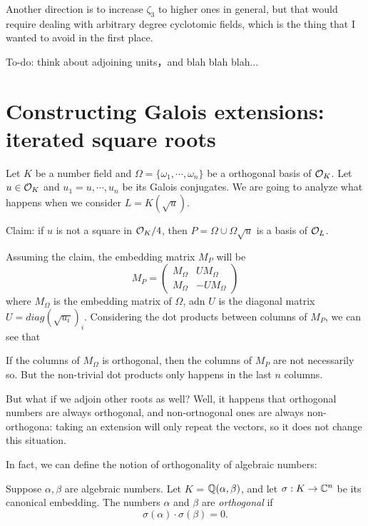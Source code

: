 \documentclass{amsart}
\begin{document}
Another direction is to increase $\zeta_3$ to higher ones in general, but that would require dealing with arbitrary degree cyclotomic fields, which is the thing that I wanted to avoid in
the first place.

To-do: think about adjoining units，and blah blah blah...


\section{Constructing Galois extensions: iterated square roots}

Let $K$ be a number field and $\Omega = \{\omega_1, \cdots, \omega_n\}$ be a orthogonal basis of $\mathcal{O}_K$. Let $u \in \mathcal{O}_K$
and $u_1 = u, \cdots, u_n$ be its Galois conjugates. We are going to
analyze what happens when we consider $L = K(\sqrt{u})$.

Claim: if $u$ is not a square in $\mathcal{O}_K/4$, then $P = \Omega \cup \Omega \sqrt{u}$ is a basis of $\mathcal{O}_L$.

Assuming the claim, the embedding matrix $M_P$ will be
\[
M_P = \left(\begin{array}{rr}
M_\Omega & U M_\Omega \\
M_\Omega & -UM_\Omega
\end{array}\right)
\]
where $M_\Omega$ is the embedding matrix of $\Omega$, adn $U$ is the diagonal matrix $U = diag(\sqrt{u_i})_i$. Considering the dot products between columns of $M_P$, we can see that

\begin{Lemma}
If the columns of $M_\Omega$ is orthogonal, then the columns of $M_P$ are not necessarily so. But the non-trivial dot products only happens in the last $n$ columns.
\end{Lemma}

But what if we adjoin other roots as well? Well, it happens that orthogonal numbers are always orthogonal, and non-ortnogonal ones
are always non-orthogona: taking an extension will only repeat the vectors, so it does not change this situation.

In fact, we can define the notion of orthogonality of algebraic numbers:

\begin{Definition}
Suppose $\alpha, \beta$ are algebraic numbers. Let $K$ = $\mathbb{Q}(\alpha,\beta)$, and let $\sigma: K \to \mathbb{C}^n$ be its canonical embedding. The numbers $\alpha$ and $\beta$ are {\em orthogonal} if
\[
    \sigma(\alpha) \cdot \sigma(\beta) = 0.
\]
\end{Definition}
\end{document}
